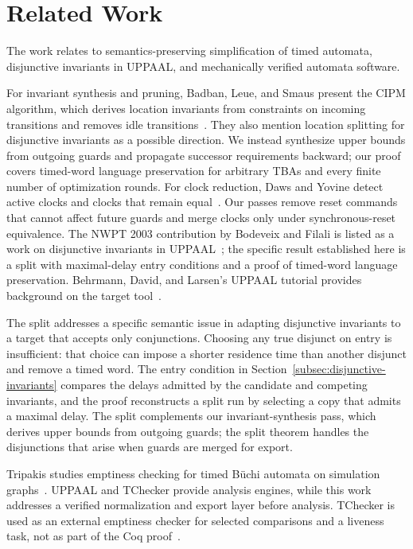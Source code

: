 \documentclass{ieeeaccess}
\begin{document}
\section{Related Work}
\label{sec:related}
The work relates to semantics-preserving simplification of timed automata, disjunctive invariants in UPPAAL, and mechanically verified automata software.

For invariant synthesis and pruning, Badban, Leue, and Smaus present the CIPM algorithm, which derives location invariants from constraints on incoming transitions and removes idle transitions~\cite{badban_etal_wing2010}. They also mention location splitting for disjunctive invariants as a possible direction. We instead synthesize upper bounds from outgoing guards and propagate successor requirements backward; our proof covers timed-word language preservation for arbitrary TBAs and every finite number of optimization rounds. For clock reduction, Daws and Yovine detect active clocks and clocks that remain equal~\cite{daws_yovine_rtss1996}. Our passes remove reset commands that cannot affect future guards and merge clocks only under synchronous-reset equivalence. The NWPT 2003 contribution by Bodeveix and Filali is listed as a work on disjunctive invariants in UPPAAL~\cite{[BF03]}; the specific result established here is a split with maximal-delay entry conditions and a proof of timed-word language preservation. Behrmann, David, and Larsen's UPPAAL tutorial provides background on the target tool~\cite{[BGD04]}.

The split addresses a specific semantic issue in adapting disjunctive
invariants to a target that accepts only conjunctions. Choosing any true
disjunct on entry is insufficient: that choice can impose a shorter residence
time than another disjunct and remove a timed word. The entry condition in
Section~\ref{subsec:disjunctive-invariants} compares the delays admitted by
the candidate and competing invariants, and the proof reconstructs a split
run by selecting a copy that admits a maximal delay. The split complements
our invariant-synthesis pass, which derives upper bounds from outgoing guards;
the split theorem handles the disjunctions that arise when guards are merged
for export.

Tripakis studies emptiness checking for timed B\"uchi automata on simulation graphs~\cite{[TS09]}. UPPAAL and TChecker provide analysis engines, while this work addresses a verified normalization and export layer before analysis. TChecker is used as an external emptiness checker for selected comparisons and a liveness task, not as part of the Coq proof~\cite{tchecker}.
\end{document}
